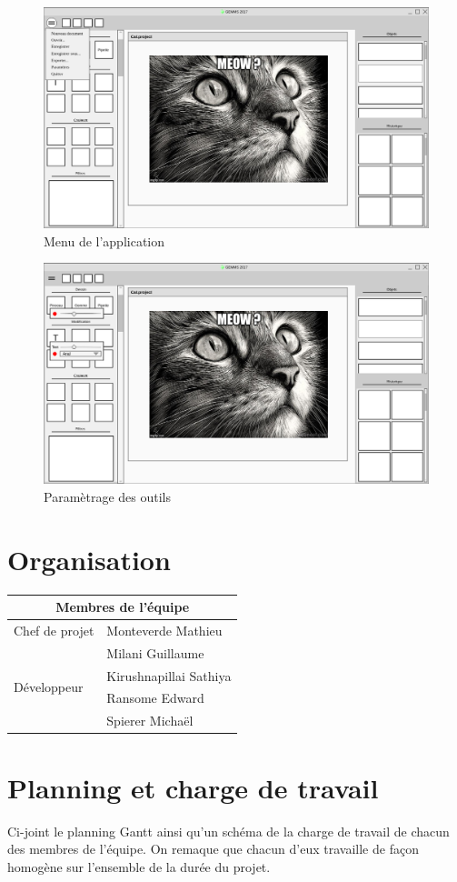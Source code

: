 \documentclass[11pt, a4paper, french]{article}
\begin{document}
		\begin{figure}[h!]
			\centering
			\graphicspath{{Mockups/}}
			\includegraphics[scale=0.3]{mockups/menu.png}
			\caption{\label{étiquette} Menu de l'application}
		\end{figure}

		\begin{figure}[h!]
			\centering
			\graphicspath{{Mockups/}}
			\includegraphics[scale=0.3]{mockups/tools_settings.png}
			\caption{\label{étiquette} Paramètrage des outils}
		\end{figure}


	\section{Organisation}
		\begin{tabular}{|l|l|}
			\hline
			\multicolumn{2}{|c|}{Membres de l'équipe} \\
			\hline
			Chef de projet &  Monteverde Mathieu \\ \hline
			\multirow{4}{*}{Développeur}
			& Milani Guillaume \\
			& Kirushnapillai Sathiya \\
			& Ransome Edward \\
			& Spierer Michaël \\ \hline
		\end{tabular}

	\section{Planning et charge de travail}
	Ci-joint le planning Gantt ainsi qu'un schéma de la charge de travail de chacun des membres de l'équipe. On remaque que chacun d'eux travaille de façon homogène sur l'ensemble de la durée du projet.
\end{document}
